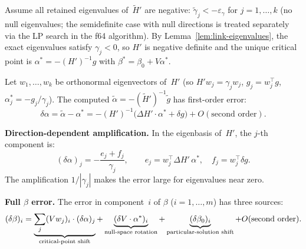 \begin{lemma}%
\label{lem:link-beta}
Assume all retained eigenvalues of~$\tilde H'$ are negative:
$\tilde\gamma_j < -\varepsilon_\gamma$ for $j = 1, \ldots, k$
(no null eigenvalues; the semidefinite case with null directions
is treated separately via the LP search in the f64 algorithm).
By Lemma~\ref{lem:link-eigenvalues}, the exact eigenvalues
satisfy $\gamma_j < 0$, so $H'$ is negative definite
and the unique critical point is
$\alpha^* = -(H')^{-1} g$ with $\beta^* = \beta_0 + V\alpha^*$.

Let $w_1, \ldots, w_k$ be orthonormal eigenvectors of~$H'$
(so $H' w_j = \gamma_j w_j$, $g_j = w_j^\top g$,
$\alpha^*_j = -g_j / \gamma_j$).
The computed $\tilde\alpha = -(\tilde H')^{-1} \tilde g$ has
first-order error:
\begin{equation}\label{eq:alpha-perturbation}
  \delta\alpha
  = \tilde\alpha - \alpha^*
  = -(H')^{-1}\bigl(\Delta H' \cdot \alpha^* + \delta g\bigr)
  + O(\text{second order}).
\end{equation}

\textbf{Direction-dependent amplification.}
In the eigenbasis of~$H'$, the $j$-th component is:
\begin{equation}\label{eq:alpha-component-error}
  (\delta\alpha)_j
  = -\frac{e_j + f_j}{\gamma_j},
  \qquad
  e_j = w_j^\top \Delta H'\, \alpha^*,
  \quad
  f_j = w_j^\top \delta g.
\end{equation}
The amplification $1/|\gamma_j|$ makes the error large for
eigenvalues near zero.

\textbf{Full $\beta$ error.}
The error in component~$i$ of $\beta$ ($i = 1, \ldots, m$) has three sources:
\begin{equation}\label{eq:beta-error-decomposition}
  (\delta\beta)_i
  = \underbrace{\sum_j (Vw_j)_i \cdot (\delta\alpha)_j}_{%
      \text{critical-point shift}}
  + \underbrace{(\delta V \cdot \alpha^*)_i}_{%
      \text{null-space rotation}}
  + \underbrace{(\delta\beta_0)_i}_{%
      \text{particular-solution shift}}
  + O(\text{second order}).
\end{equation}


\end{lemma}
